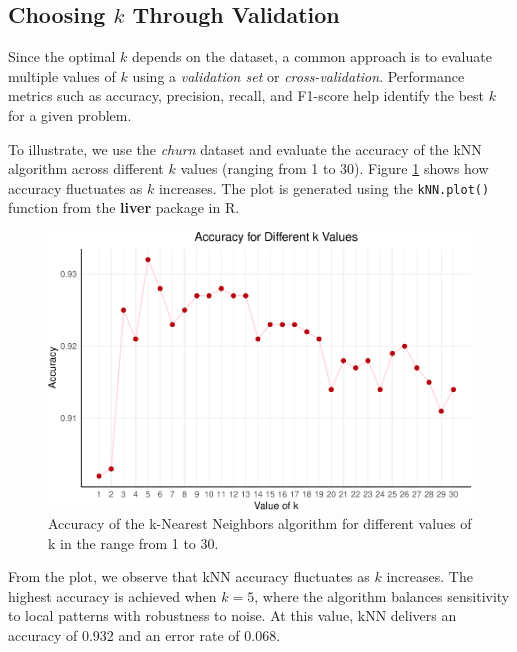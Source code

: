 \documentclass[
]{book}
\newcommand{\passthrough}[1]{#1}
\theoremstyle{definition}
\theoremstyle{definition}
\theoremstyle{definition}
\theoremstyle{definition}
\theoremstyle{remark}
\begin{document}
\subsection*{\texorpdfstring{Choosing \(k\) Through Validation}{Choosing k Through Validation}}\label{choosing-k-through-validation}

Since the optimal \(k\) depends on the dataset, a common approach is to evaluate multiple values of \(k\) using a \emph{validation set} or \emph{cross-validation}. Performance metrics such as accuracy, precision, recall, and F1-score help identify the best \(k\) for a given problem.

To illustrate, we use the \emph{churn} dataset and evaluate the accuracy of the kNN algorithm across different \(k\) values (ranging from 1 to 30). Figure \ref{fig:kNN-plot} shows how accuracy fluctuates as \(k\) increases. The plot is generated using the \passthrough{\lstinline!kNN.plot()!} function from the \textbf{liver} package in R.

\begin{figure}

{\centering \includegraphics[width=0.85\linewidth]{knn_files/figure-latex/kNN-plot-1} 

}

\caption{Accuracy of the k-Nearest Neighbors algorithm for different values of k in the range from 1 to 30.}\label{fig:kNN-plot}
\end{figure}

From the plot, we observe that kNN accuracy fluctuates as \(k\) increases. The highest accuracy is achieved when \(k = 5\), where the algorithm balances sensitivity to local patterns with robustness to noise. At this value, kNN delivers an accuracy of 0.932 and an error rate of 0.068.
\end{document}
